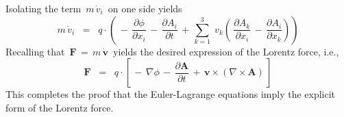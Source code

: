Isolating the term \,$m\,\dot{v}_{i}$\, on one side yields
\begin{equation*}
m\,\dot{v}_{i}
\;\; = \;\;
    q \cdot\!\left(\,
        -\,
        \dfrac{\partial\phi}{\partial x_{i}}
        \, - \,
        \dfrac{\partial A_{i}}{\partial t}
        \, + \,
        \overset{3}{\underset{k=1}{\sum}}\;v_{k}\left(\,
            \dfrac{\partial A_{k}}{\partial x_{i}}
            \, - \,
            \dfrac{\partial A_{i}}{\partial x_{k}}
            \right)
        \right)
\end{equation*}
Recalling that
\,$\mathbf{F} \,=\, m\,\dot{\mathbf{v}}$\,
yields the desired expression of the Lorentz force, i.e.,
\begin{equation*}
\mathbf{F}
\;\; = \;\;
    q \cdot
    \left[\,
          -\, \nabla\phi
        \,-\, \dfrac{\partial\mathbf{A}}{\partial t}
        \,+\, \mathbf{v} \times (\nabla \times \mathbf{A})
        \,\right]
\end{equation*}
This completes the proof that the Euler-Lagrange equations
imply the explicit form of the Lorentz force.

